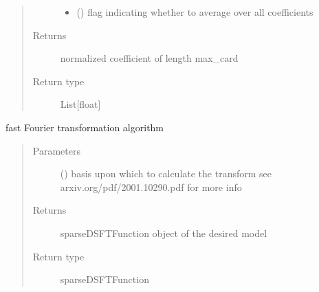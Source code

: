 \documentclass[letterpaper,10pt,english]{sphinxmanual}
\begin{document}
\begin{fulllineitems}
\begin{fulllineitems}
\begin{quote}
\begin{description}
\begin{itemize}
\item {} 
\sphinxAtStartPar
{} () \textendash{} flag indicating whether to average over all coefficients

\end{itemize}

\item[{Returns}] \leavevmode
\sphinxAtStartPar
normalized coefficient of length max\_card

\item[{Return type}] \leavevmode
\sphinxAtStartPar
List{[}float{]}

\end{description}\end{quote}

\end{fulllineitems}


\begin{fulllineitems}
\label{\detokenize{setFTs:setFTs.setfunctions.WrapSignal.transform_fast}}
\sphinxAtStartPar
fast Fourier transformation algorithm
\begin{quote}\begin{description}
\item[{Parameters}] \leavevmode
\sphinxAtStartPar
{} () \textendash{} basis upon which to calculate the transform see arxiv.org/pdf/2001.10290.pdf for more info

\item[{Returns}] \leavevmode
\sphinxAtStartPar
sparseDSFTFunction object of the desired model

\item[{Return type}] \leavevmode
\sphinxAtStartPar
sparseDSFTFunction

\end{description}\end{quote}

\end{fulllineitems}



\end{fulllineitems}
\end{document}
